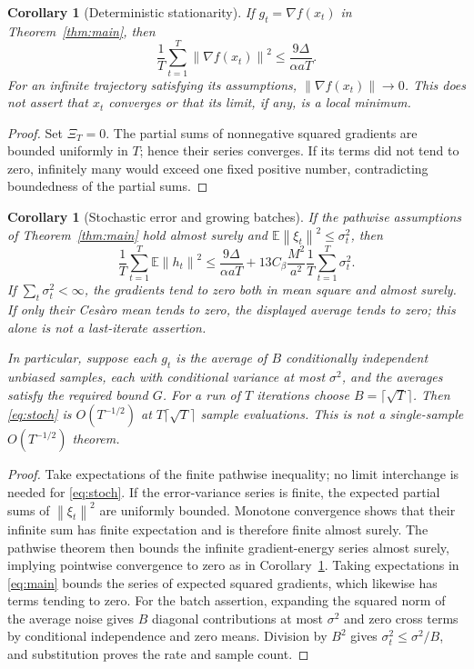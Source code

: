 \documentclass[11pt,a4paper]{article}
\newtheorem{corollary}[theorem]{Corollary}
\theoremstyle{definition}
\theoremstyle{remark}
\newcommand{\E}{\mathbb E}
\newcommand{\norm}[1]{\left\lVert#1\right\rVert}
\begin{document}
\begin{corollary}[Deterministic stationarity]\label{cor:det}
If $g_t=\nabla f(x_t)$ in Theorem~\ref{thm:main}, then
\[
 \frac1T\sum_{t=1}^T\norm{\nabla f(x_t)}^2\le\frac{9\Delta}{\alpha aT}.
\]
For an infinite trajectory satisfying its assumptions, $\norm{\nabla f(x_t)}\to0$.
This does not assert that $x_t$ converges or that its limit, if any, is a
local minimum.
\end{corollary}
\begin{proof}
Set $\Xi_T=0$. The partial sums of nonnegative squared gradients are bounded
uniformly in $T$; hence their series converges. If its terms did not tend to
zero, infinitely many would exceed one fixed positive number, contradicting
boundedness of the partial sums.
\end{proof}

\begin{corollary}[Stochastic error and growing batches]\label{cor:noise}
If the pathwise assumptions of Theorem~\ref{thm:main} hold almost surely and
$\E\norm{\xi_t}^2\le\sigma_t^2$, then
\begin{equation}\label{eq:stoch}
 \frac1T\sum_{t=1}^T\E\norm{h_t}^2
 \le\frac{9\Delta}{\alpha aT}
 +13C_\beta\frac{M^2}{a^2}\frac1T\sum_{t=1}^T\sigma_t^2.
\end{equation}
If $\sum_t\sigma_t^2<\infty$, the gradients tend to zero both in mean square
and almost surely. If only their Ces\`aro mean tends to zero, the displayed
average tends to zero; this alone is not a last-iterate assertion.

In particular, suppose each $g_t$ is the average of $B$ conditionally
independent unbiased samples, each with conditional variance at most
$\sigma^2$, and the averages satisfy the required bound $G$. For a run of
$T$ iterations choose $B=\lceil\sqrt T\rceil$. Then \eqref{eq:stoch} is
$O(T^{-1/2})$ at $T\lceil\sqrt T\rceil$ sample evaluations. This is not a
single-sample $O(T^{-1/2})$ theorem.
\end{corollary}
\begin{proof}
Take expectations of the finite pathwise inequality; no limit interchange is
needed for \eqref{eq:stoch}. If the error-variance series is finite, the expected
partial sums of $\norm{\xi_t}^2$ are uniformly bounded. Monotone convergence
shows that their infinite sum has finite expectation and is therefore finite
almost surely. The pathwise theorem then bounds the infinite gradient-energy
series almost surely, implying pointwise convergence to zero as in
Corollary~\ref{cor:det}. Taking expectations in \eqref{eq:main} bounds the
series of expected squared gradients, which likewise has terms tending to
zero. For the batch assertion, expanding the squared norm of the average
noise gives $B$ diagonal contributions at most $\sigma^2$ and zero cross
terms by conditional independence and zero means. Division by $B^2$ gives
$\sigma_t^2\le\sigma^2/B$, and substitution proves the rate and sample count.
\end{proof}
\end{document}
